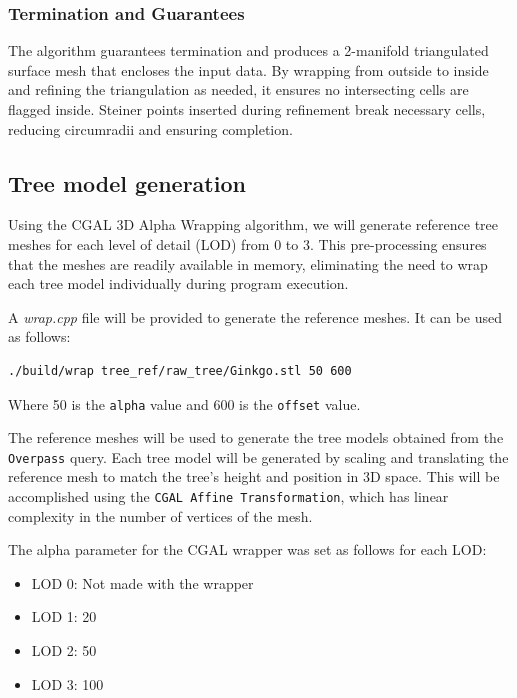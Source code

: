 \documentclass[12pt]{article}
\begin{document}
\subsubsection{Termination and Guarantees}
The algorithm guarantees termination and produces a 2-manifold triangulated
surface mesh that encloses the input data. By wrapping from outside to inside
and refining the triangulation as needed, it ensures no intersecting cells are
flagged inside. Steiner points inserted during refinement break necessary cells,
 reducing circumradii and ensuring completion.


\subsection{Tree model generation}
Using the CGAL 3D Alpha Wrapping algorithm, we will generate reference tree
meshes for each level of detail (LOD) from 0 to 3. This pre-processing ensures
that the meshes are readily available in memory, eliminating the need to wrap
each tree model individually during program execution.

A \textit{wrap.cpp} file will be provided to generate the reference meshes.
It can be used as follows:

\begin{lstlisting}[language=bash]
./build/wrap tree_ref/raw_tree/Ginkgo.stl 50 600
\end{lstlisting}

Where 50 is the \texttt{alpha} value and 600 is the \texttt{offset} value.

The reference meshes will be used to generate the tree models obtained from
the \texttt{Overpass} query. Each tree model will be generated by scaling and
translating the reference mesh to match the tree's height and position in 3D space.
 This will be accomplished using the \texttt{CGAL Affine Transformation}\cite{cgal_affine_transformation},
which has linear complexity in the number of vertices of the mesh.

\newpage

The alpha parameter for the CGAL wrapper was set as follows for each LOD:

\begin{itemize}
    \item LOD 0: Not made with the wrapper
    \item LOD 1: 20
    \item LOD 2: 50
    \item LOD 3: 100
\end{itemize}
\end{document}
